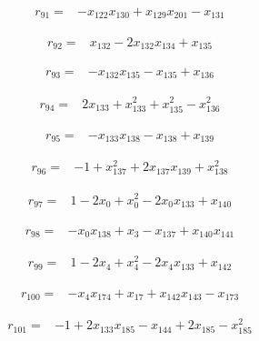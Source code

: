 \begin{align*}
r_{91}={}&-x_{122}x_{130}+x_{129}x_{201}-x_{131}
\end{align*}

\begin{align*}
r_{92}={}&x_{132}-2x_{132}x_{134}+x_{135}
\end{align*}

\begin{align*}
r_{93}={}&-x_{132}x_{135}-x_{135}+x_{136}
\end{align*}

\begin{align*}
r_{94}={}&2x_{133}+x_{133}^{2}+x_{135}^{2}-x_{136}^{2}
\end{align*}

\begin{align*}
r_{95}={}&-x_{133}x_{138}-x_{138}+x_{139}
\end{align*}

\begin{align*}
r_{96}={}&-1+x_{137}^{2}+2x_{137}x_{139}+x_{138}^{2}
\end{align*}

\begin{align*}
r_{97}={}&1-2x_{0}+x_{0}^{2}-2x_{0}x_{133}+x_{140}
\end{align*}

\begin{align*}
r_{98}={}&-x_{0}x_{138}+x_{3}-x_{137}+x_{140}x_{141}
\end{align*}

\begin{align*}
r_{99}={}&1-2x_{4}+x_{4}^{2}-2x_{4}x_{133}+x_{142}
\end{align*}

\begin{align*}
r_{100}={}&-x_{4}x_{174}+x_{17}+x_{142}x_{143}-x_{173}
\end{align*}

\begin{align*}
r_{101}={}&-1+2x_{133}x_{185}-x_{144}+2x_{185}-x_{185}^{2}
\end{align*}

